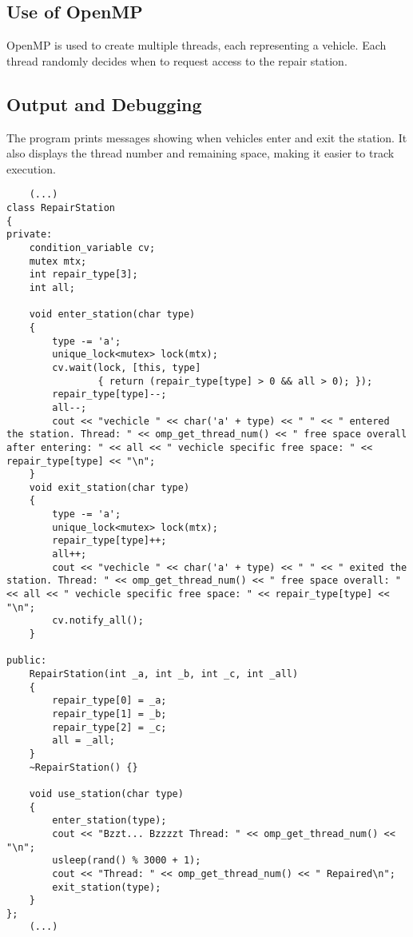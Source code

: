 \documentclass[a4paper,11pt]{article}
\begin{document}
\subsection*{Use of OpenMP}
OpenMP is used to create multiple threads, each representing a vehicle. Each thread randomly decides when to request access to the repair station.

\subsection*{Output and Debugging}
The program prints messages showing when vehicles enter and exit the station. It also displays the thread number and remaining space, making it easier to track execution.

\begin{verbatim}
    (...)
class RepairStation
{
private:
    condition_variable cv;
    mutex mtx;
    int repair_type[3];
    int all;

    void enter_station(char type)
    {
        type -= 'a';
        unique_lock<mutex> lock(mtx);
        cv.wait(lock, [this, type]
                { return (repair_type[type] > 0 && all > 0); });
        repair_type[type]--;
        all--;
        cout << "vechicle " << char('a' + type) << " " << " entered the station. Thread: " << omp_get_thread_num() << " free space overall after entering: " << all << " vechicle specific free space: " << repair_type[type] << "\n";
    }
    void exit_station(char type)
    {
        type -= 'a';
        unique_lock<mutex> lock(mtx);
        repair_type[type]++;
        all++;
        cout << "vechicle " << char('a' + type) << " " << " exited the station. Thread: " << omp_get_thread_num() << " free space overall: " << all << " vechicle specific free space: " << repair_type[type] << "\n";
        cv.notify_all();
    }

public:
    RepairStation(int _a, int _b, int _c, int _all)
    {
        repair_type[0] = _a;
        repair_type[1] = _b;
        repair_type[2] = _c;
        all = _all;
    }
    ~RepairStation() {}

    void use_station(char type)
    {
        enter_station(type);
        cout << "Bzzt... Bzzzzt Thread: " << omp_get_thread_num() << "\n";
        usleep(rand() % 3000 + 1);
        cout << "Thread: " << omp_get_thread_num() << " Repaired\n";
        exit_station(type);
    }
};
    (...)
\end{verbatim}
\end{document}
